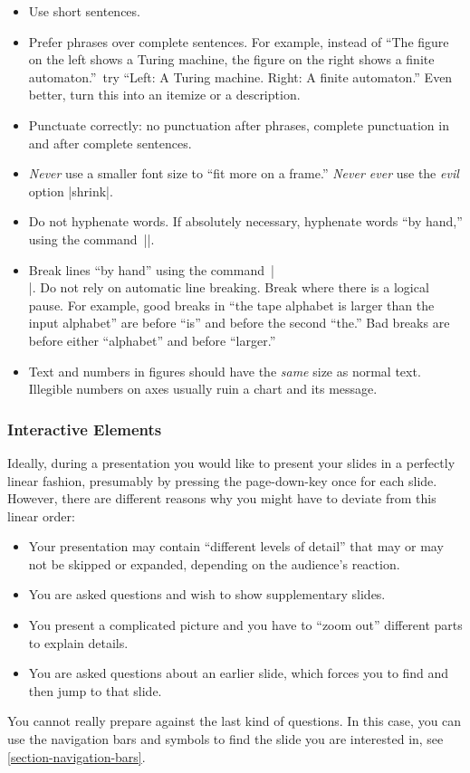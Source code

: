 \begin{itemize}
\item
  Use short sentences.
\item
  Prefer phrases over complete sentences. For example,
  instead of ``The figure on the left shows a Turing machine, the
  figure on the right shows a finite automaton.''\ try ``Left: A Turing
  machine. Right: A finite automaton.'' Even better, turn this into an
  itemize or a description.
\item
  Punctuate correctly: no punctuation after phrases, complete
  punctuation in and after complete sentences.
\item
  \emph{Never} use a smaller font size to ``fit more on a frame.''
  \emph{Never ever} use the \emph{evil} option |shrink|.
\item
  Do not hyphenate words. If absolutely necessary, hyphenate words
  ``by hand,'' using the command~|\-|.
\item
  Break lines ``by hand'' using the command~|\\|. Do not rely on
  automatic line breaking. Break where there is a logical pause. For 
  example, good breaks in ``the tape alphabet is larger
  than the input alphabet'' are before ``is'' and before the second
  ``the.'' Bad breaks are before either ``alphabet'' and before
  ``larger.''
\item
  Text and numbers in figures should have the \emph{same} size as
  normal text. Illegible numbers on axes usually ruin a chart and its
  message.
\end{itemize}




\subsubsection{Interactive Elements}

Ideally, during a presentation you would like to present your
slides in a perfectly linear fashion, presumably by pressing the
page-down-key once for each slide. However, there are different
reasons why you might have to deviate from this linear order:
\begin{itemize}
\item
  Your presentation may contain ``different levels of detail'' that
  may or may not be skipped or expanded, depending on the audience's
  reaction.
\item
  You are asked questions and wish to show supplementary slides.
\item
  You present a complicated picture and you have to ``zoom out''
  different parts to explain details.
\item
  You are asked questions about an earlier slide, which forces you to 
  find and then jump to that slide.
\end{itemize}
You cannot really prepare against the last kind of questions. In this
case, you can use the navigation bars and symbols to find the slide
you are interested in, see \ref{section-navigation-bars}.


